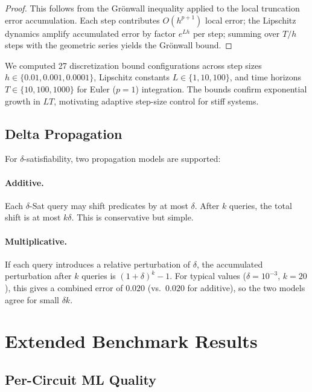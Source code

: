 \documentclass[11pt]{article}
\begin{document}
\begin{proof}
This follows from the Gr\"onwall inequality applied to the local
truncation error accumulation. Each step contributes $O(h^{p+1})$ local
error; the Lipschitz dynamics amplify accumulated error by factor
$e^{Lh}$ per step; summing over $T/h$ steps with the geometric series
yields the Gr\"onwall bound.
\end{proof}

We computed 27 discretization bound configurations across step sizes
$h \in \{0.01, 0.001, 0.0001\}$, Lipschitz constants
$L \in \{1, 10, 100\}$, and time horizons $T \in \{10, 100, 1000\}$
for Euler ($p=1$) integration. The bounds confirm exponential growth
in $LT$, motivating adaptive step-size control for stiff systems.

\subsection{Delta Propagation}

For $\delta$-satisfiability, two propagation models are supported:

\paragraph{Additive.} Each $\delta$-Sat query may shift predicates by
at most $\delta$. After $k$ queries, the total shift is at most
$k\delta$. This is conservative but simple.

\paragraph{Multiplicative.} If each query introduces a relative
perturbation of $\delta$, the accumulated perturbation after $k$
queries is $(1+\delta)^k - 1$. For typical values ($\delta = 10^{-3}$,
$k = 20$), this gives a combined error of $0.020$ (vs.\ $0.020$ for
additive), so the two models agree for small $\delta k$.

\section{Extended Benchmark Results}
\label{app:extended}

\subsection{Per-Circuit ML Quality}
\end{document}
